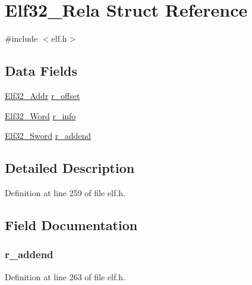 \hypertarget{struct_elf32___rela}{\section{Elf32\-\_\-\-Rela Struct Reference}
\label{struct_elf32___rela}
}


{\ttfamily \#include $<$elf.\-h$>$}

\subsection*{Data Fields}
\begin{DoxyCompactItemize}
\item 
\hyperlink{elf_8h_a40c6d4571e6001f443cc6a6474620158}{Elf32\-\_\-\-Addr} \hyperlink{struct_elf32___rela_af7703a68dd2cbebc5df1fc4ac1ac75a8}{r\-\_\-offset}
\item 
\hyperlink{elf_8h_af5924ece606c732e86f8263a19408e45}{Elf32\-\_\-\-Word} \hyperlink{struct_elf32___rela_ac6df6d36f5c8d656fe4e749c859283af}{r\-\_\-info}
\item 
\hyperlink{elf_8h_a30ce6352cf03c667272698ada477da95}{Elf32\-\_\-\-Sword} \hyperlink{struct_elf32___rela_aa21c65189c4205d90c14e321c082f5a3}{r\-\_\-addend}
\end{DoxyCompactItemize}


\subsection{Detailed Description}


Definition at line 259 of file elf.\-h.



\subsection{Field Documentation}
\hypertarget{struct_elf32___rela_aa21c65189c4205d90c14e321c082f5a3}{
\subsubsection[{r\-\_\-addend}]{ r\-\_\-addend}}\label{struct_elf32___rela_aa21c65189c4205d90c14e321c082f5a3}


Definition at line 263 of file elf.\-h.


